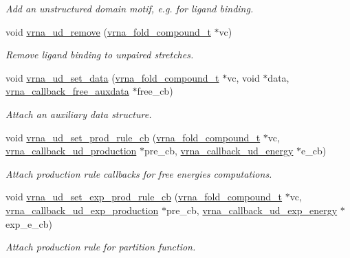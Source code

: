 \begin{DoxyCompactItemize}
\begin{DoxyCompactList}\small\item\em Add an unstructured domain motif, e.\+g. for ligand binding. \end{DoxyCompactList}\item 
void \hyperlink{group__domains__up_gada59cb0c498b812eadd010811af3f2d4}{vrna\+\_\+ud\+\_\+remove} (\hyperlink{group__fold__compound_ga1b0cef17fd40466cef5968eaeeff6166}{vrna\+\_\+fold\+\_\+compound\+\_\+t} $\ast$vc)
\begin{DoxyCompactList}\small\item\em Remove ligand binding to unpaired stretches. \end{DoxyCompactList}\item 
void \hyperlink{group__domains__up_gac1f18c312b91d80089534a87d956e58b}{vrna\+\_\+ud\+\_\+set\+\_\+data} (\hyperlink{group__fold__compound_ga1b0cef17fd40466cef5968eaeeff6166}{vrna\+\_\+fold\+\_\+compound\+\_\+t} $\ast$vc, void $\ast$data, \hyperlink{group__fold__compound_ga7806651f51b195013839a218b3bbd5a3}{vrna\+\_\+callback\+\_\+free\+\_\+auxdata} $\ast$free\+\_\+cb)
\begin{DoxyCompactList}\small\item\em Attach an auxiliary data structure. \end{DoxyCompactList}\item 
void \hyperlink{group__domains__up_ga745a99f0bc72898d54de16f6e538828a}{vrna\+\_\+ud\+\_\+set\+\_\+prod\+\_\+rule\+\_\+cb} (\hyperlink{group__fold__compound_ga1b0cef17fd40466cef5968eaeeff6166}{vrna\+\_\+fold\+\_\+compound\+\_\+t} $\ast$vc, \hyperlink{group__domains__up_ga4fdfc02c1b660c07f2d887772f02a0a1}{vrna\+\_\+callback\+\_\+ud\+\_\+production} $\ast$pre\+\_\+cb, \hyperlink{group__domains__up_ga75825c57d0bfde4ae4f95c044260c5c3}{vrna\+\_\+callback\+\_\+ud\+\_\+energy} $\ast$e\+\_\+cb)
\begin{DoxyCompactList}\small\item\em Attach production rule callbacks for free energies computations. \end{DoxyCompactList}\item 
void \hyperlink{group__domains__up_ga2fb1db2099da26c76247e1209ad4aa09}{vrna\+\_\+ud\+\_\+set\+\_\+exp\+\_\+prod\+\_\+rule\+\_\+cb} (\hyperlink{group__fold__compound_ga1b0cef17fd40466cef5968eaeeff6166}{vrna\+\_\+fold\+\_\+compound\+\_\+t} $\ast$vc, \hyperlink{group__domains__up_ga33d78327dcd04c1ca5ab2887edc18c7b}{vrna\+\_\+callback\+\_\+ud\+\_\+exp\+\_\+production} $\ast$pre\+\_\+cb, \hyperlink{group__domains__up_ga861706f257ba993753464b823e65b86e}{vrna\+\_\+callback\+\_\+ud\+\_\+exp\+\_\+energy} $\ast$exp\+\_\+e\+\_\+cb)
\begin{DoxyCompactList}\small\item\em Attach production rule for partition function. \end{DoxyCompactList}\end{DoxyCompactItemize}


